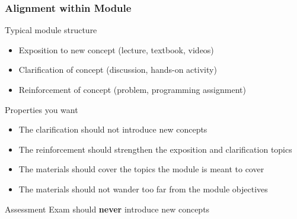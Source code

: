 \documentclass[aspectratio=169]{beamer}
\begin{document}
\begin{frame}
  \frametitle{Alignment within Module}

  \begin{block}{Typical module structure}
    \begin{itemize}
    \item Exposition to new concept (lecture, textbook, videos)
    \item Clarification of concept (discussion, hands-on activity)
    \item Reinforcement of concept (problem, programming assignment)
    \end{itemize}
  \end{block}
  
  \begin{block}{Properties you want}
    \begin{itemize}
    \item The clarification should not introduce new concepts
    \item The reinforcement should strengthen the exposition and clarification topics
    \item The materials should cover the topics the module is meant to cover
    \item The materials should not wander too far from the module objectives
    \end{itemize}
  \end{block}

  \begin{block}{Assessment}
    Exam should \textbf{never} introduce new concepts
  \end{block}  
\end{frame}
\end{document}
